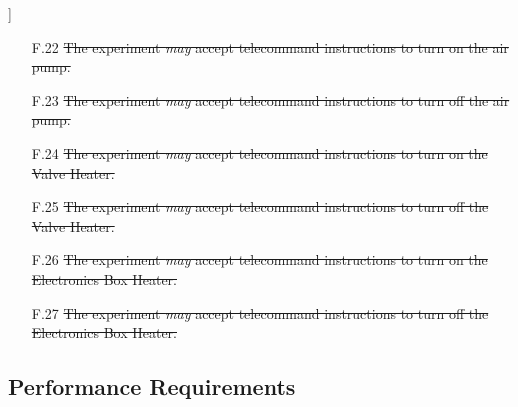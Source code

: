 ]\documentclass[a4paper,12pt,twoside]{article}
\providecommand{\DIFaddtex}[1]{{\protect\color{blue}\uwave{#1}}} %
\providecommand{\DIFaddend}{} %
\providecommand{\DIFadd}[1]{\texorpdfstring{\DIFaddtex{#1}}{#1}} %
\DeclareRobustCommand{\DIFaddend}{\DIFOaddend \let\includegraphics\DIFOincludegraphics} %
\begin{document}
\begin{enumerate}
{    }\item[F.22] \st{The experiment \textit{may} accept telecommand instructions to turn on the air pump.}\DIFadd{\textsuperscript{\ref{fn:unnecessary-requirement}}
    }\item[F.23] \st{The experiment \textit{may} accept telecommand instructions to turn off the air pump.}\DIFadd{\textsuperscript{\ref{fn:unnecessary-requirement}}
    }\item[F.24] \st{The experiment \textit{may} accept telecommand instructions to turn on the Valve Heater.}\DIFadd{\textsuperscript{\ref{fn:unnecessary-requirement}}
    }\item[F.25] \st{The experiment \textit{may} accept telecommand instructions to turn off the Valve Heater.}\DIFadd{\textsuperscript{\ref{fn:unnecessary-requirement}}
    }\item[F.26] \st{The experiment \textit{may} accept telecommand instructions to turn on the Electronics Box Heater.}\DIFadd{\textsuperscript{\ref{fn:unnecessary-requirement}}
    }\item[F.27] \st{The experiment \textit{may} accept telecommand instructions to turn off the Electronics Box Heater.}\DIFadd{\textsuperscript{\ref{fn:unnecessary-requirement}}
}\DIFaddend \end{enumerate}
\pagebreak
\subsection{Performance Requirements}
\end{document}
